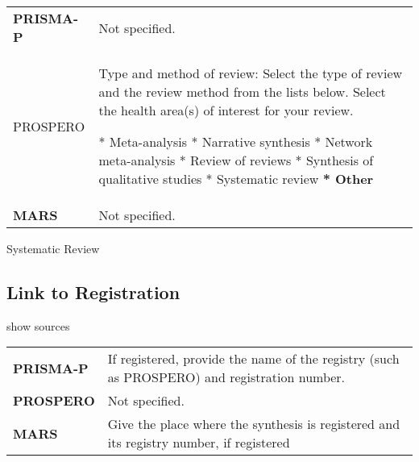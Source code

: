 \documentclass[
]{article}
\begin{document}
\hypertarget{typeor}{}
\begin{collapse}

\begin{table}[H]
\centering
\begin{tabular}{>{}l|l}
\hline
\cellcolor[HTML]{ececec}{source} & \cellcolor[HTML]{ececec}{description}\\
\hline
\textbf{PRISMA-P} & Not specified.\\
\hline
PROSPERO & Type and method of review: Select the type of review and the review method from the lists below. Select the health area(s) of interest for your review.

* Meta-analysis
* Narrative synthesis
* Network meta-analysis
* Review of reviews
* Synthesis of qualitative studies
* Systematic review
\textbf{* Other}\\
\hline
\textbf{MARS} & Not specified.\\
\hline
\end{tabular}
\end{table}

\end{collapse}

Systematic Review

\hypertarget{link-to-registration}{%
\subsection{Link to Registration}\label{link-to-registration}}

show sources

\hypertarget{ltr}{}
\begin{collapse}

\begin{table}[H]
\centering
\begin{tabular}{>{}l|l}
\hline
\cellcolor[HTML]{ececec}{source} & \cellcolor[HTML]{ececec}{description}\\
\hline
\textbf{PRISMA-P} & If registered, provide the name of the registry (such as PROSPERO) and registration number.\\
\hline
\textbf{PROSPERO} & Not specified.\\
\hline
\textbf{MARS} & Give the place where the synthesis is registered and its registry number, if registered\\
\hline
\end{tabular}
\end{table}

\end{collapse}
\end{document}
